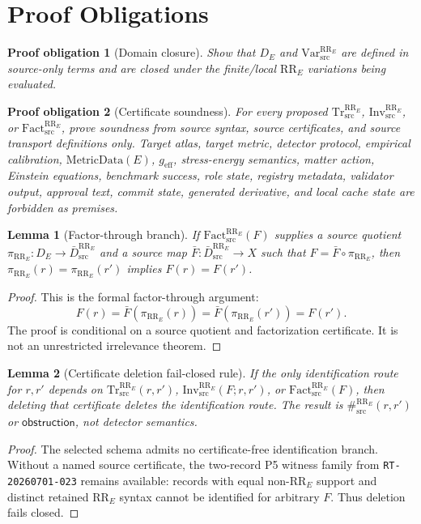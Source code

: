 \documentclass[11pt]{article}
\newcommand{\RRE}{\mathrm{RR}_{E}}
\newcommand{\VarRR}{\mathrm{Var}^{\RRE}_{\mathrm{src}}}
\newcommand{\TrRR}{\mathrm{Tr}^{\RRE}_{\mathrm{src}}}
\newcommand{\InvRR}{\mathrm{Inv}^{\RRE}_{\mathrm{src}}}
\newcommand{\FactRR}{\mathrm{Fact}^{\RRE}_{\mathrm{src}}}
\newcommand{\SepRR}{\#^{\RRE}_{\mathrm{src}}}
\newcommand{\QRR}{\bar D^{\RRE}_{\mathrm{src}}}
\newcommand{\MetricData}{\mathrm{MetricData}}
\newcommand{\geff}{g_{\mathrm{eff}}}
\newcommand{\Obstruction}{\mathsf{obstruction}}
\newtheorem{lemma}{Lemma}
\newtheorem{obligation}{Proof obligation}
\begin{document}
\section{Proof Obligations}

\begin{obligation}[Domain closure]
Show that \(D_E\) and \(\VarRR\) are defined in source-only terms and are
closed under the finite/local \(\RRE\) variations being evaluated.
\end{obligation}

\begin{obligation}[Certificate soundness]
For every proposed \(\TrRR\), \(\InvRR\), or \(\FactRR\), prove soundness from
source syntax, source certificates, and source transport definitions only.
Target atlas, target metric, detector protocol, empirical calibration,
\(\MetricData(E)\), \(\geff\), stress-energy semantics, matter action,
Einstein equations, benchmark success, role state, registry metadata,
validator output, approval text, commit state, generated derivative, and local
cache state are forbidden as premises.
\end{obligation}

\begin{lemma}[Factor-through branch]
If \(\FactRR(F)\) supplies a source quotient \(\pi_{\RRE}:D_E\to\QRR\) and a
source map \(\bar F:\QRR\to X\) such that \(F=\bar F\circ\pi_{\RRE}\), then
\(\pi_{\RRE}(r)=\pi_{\RRE}(r')\) implies \(F(r)=F(r')\).
\end{lemma}

\begin{proof}
This is the formal factor-through argument:
\[
F(r)=\bar F(\pi_{\RRE}(r))=\bar F(\pi_{\RRE}(r'))=F(r').
\]
The proof is conditional on a source quotient and factorization certificate.
It is not an unrestricted irrelevance theorem.
\end{proof}

\begin{lemma}[Certificate deletion fail-closed rule]
If the only identification route for \(r,r'\) depends on
\(\TrRR(r,r')\), \(\InvRR(F;r,r')\), or \(\FactRR(F)\), then deleting that
certificate deletes the identification route. The result is
\(\SepRR(r,r')\) or \(\Obstruction\), not detector semantics.
\end{lemma}

\begin{proof}
The selected schema admits no certificate-free identification branch. Without
a named source certificate, the two-record P5 witness family from
\texttt{RT-20260701-023} remains available: records with equal non-\(\RRE\)
support and distinct retained \(\RRE\) syntax cannot be identified for
arbitrary \(F\). Thus deletion fails closed.
\end{proof}
\end{document}
